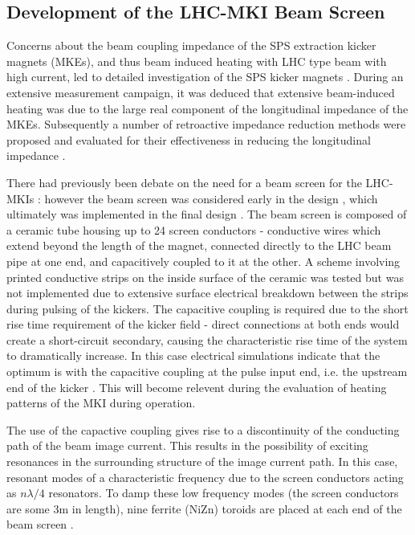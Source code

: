 \subsection{Development of the LHC-MKI Beam Screen}
\label{sec:mki-screen-development}

Concerns about the beam coupling impedance of the SPS extraction kicker magnets (MKEs), and thus beam induced heating with LHC type beam with high current, led to detailed investigation of the SPS kicker magnets \cite{Arduini:beamInducedSPS}. During an extensive measurement campaign, it was deduced that extensive beam-induced heating was due to the large real component of the longitudinal impedance of the MKEs. Subsequently a number of retroactive impedance reduction methods were proposed and evaluated for their effectiveness in reducing the longitudinal impedance \cite{Kroyer:MKEReduct}.

There had previously been debate on the need for a beam screen for the LHC-MKIs \cite{Vos:beamScreen}: however the beam screen was considered early in the design \cite{Ducimetiere:designMKI}, which ultimately was implemented in the final design \cite{Barnes:improvBeamScreen}. The beam screen is composed of a ceramic tube housing up to 24 screen conductors - conductive wires which extend beyond the length of the magnet, connected directly to the LHC beam pipe at one end, and capacitively coupled to it at the other. A scheme involving printed conductive strips on the inside surface of the ceramic was tested but was not implemented due to extensive surface electrical breakdown between the strips during pulsing of the kickers. The capacitive coupling is required due to the short rise time requirement of the kicker field - direct connections at both ends would create a short-circuit secondary, causing the characteristic rise time of the system to dramatically increase. In this case electrical simulations indicate that the optimum is with the capacitive coupling at the pulse input end, i.e. the upstream end of the kicker \cite{Barnes:improvBeamScreen}. This will become relevent during the evaluation of heating patterns of the MKI during operation.

The use of the capactive coupling gives rise to a discontinuity of the conducting path of the beam image current. This results in the possibility of exciting resonances in the surrounding structure of the image current path. In this case, resonant modes of a characteristic frequency due to the screen conductors acting as $n \lambda /4$ resonators. To damp these low frequency modes (the screen conductors are some 3m in length), nine ferrite (NiZn) toroids are placed at each end of the beam screen \cite{Caspers:impMeasMKI, Caspera:impMeasLowFreqMKI, Barnes:mkiVacTemp}. 

